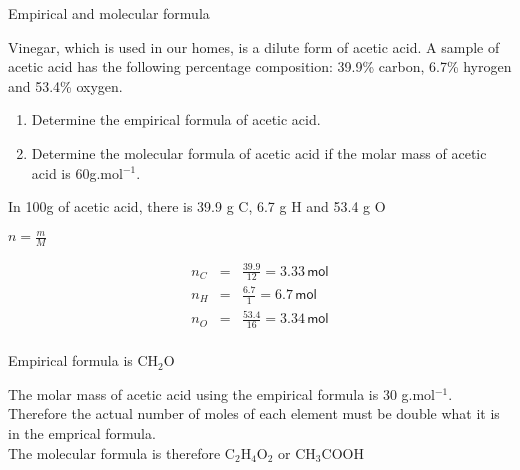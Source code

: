 \begin{wex}{Empirical and molecular formula\\}{Vinegar, which is used in our homes, is a dilute form of acetic acid. A sample of acetic acid has the following percentage composition: 39.9\% carbon, 6.7\% hyrogen and 53.4\% oxygen.

	\begin{enumerate}
	\item{Determine the empirical formula of acetic acid.}
	\item{Determine the molecular formula of acetic acid if the molar mass of acetic acid is 60g.mol$^{-1}$.}
	\end{enumerate}
}

{

In 100g of acetic acid, there is 39.9 g C, 6.7 g H and 53.4 g O \\
}

{
 
$n= \frac{m}{M}$

\begin{eqnarray*}
n_C&=& \frac{39.9}{12} = 3.33\, \textsf{mol} \\
n_H&=& \frac{6.7}{1} = 6.7\, \textsf{mol}  \\
n_O&=& \frac{53.4}{16} = 3.34\, \textsf{mol} \\
\end{eqnarray*}
}

{

Empirical formula is CH$_2$O\\
}

{

The molar mass of acetic acid using the empirical formula is 30 g.mol$^{-1}$. Therefore the actual number of moles of each element must be double what it is in the emprical formula.\\

The molecular formula is therefore C$_2$H$_4$O$_2$ or CH$_3$COOH
}
\end{wex}


